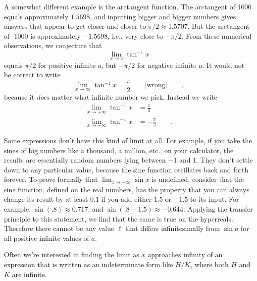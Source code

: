 A somewhat different example is the arctangent function. The arctangent of 1000 equals
approximately $1.5698$, and inputting bigger and bigger numbers gives answers that appear
to get closer and closer to $\pi/2\approx1.5707$. But the arctangent
of -1000 is approximately $-1.5698$, i.e., very close to $-\pi/2$.
From these numerical
observations, we conjecture that
\begin{equation*}
   \lim_{x\rightarrow a} \tan^{-1} x
\end{equation*}
equals $\pi/2$ for positive infinite $a$, but $-\pi/2$ for negative infinite $a$.
It would not be correct to write
\begin{equation*}
   \lim_{x\rightarrow \infty} \tan^{-1} x = \frac{\pi}{2} \qquad \text{[wrong]} \qquad ,
\end{equation*}
because it \emph{does} matter what infinite number we pick. Instead we write
\begin{align*}
   \lim_{x\rightarrow +\infty} \tan^{-1} x &= \frac{\pi}{2} \\
   \lim_{x\rightarrow -\infty} \tan^{-1} x &= -\frac{\pi}{2} \qquad .
\end{align*}

Some expressions don't have this kind of limit at all. For example, if you take the
sines of big numbers like a thousand, a million, etc., on your calculator, the results
are essentially random numbers lying between $-1$ and 1. They don't settle down to any
particular value, because the sine function oscillates back and forth forever.
To prove formally that $\lim_{x\rightarrow +\infty} \sin x$ is undefined, consider that the sine function, defined on the real
numbers, has the property that you can always change its result by at least $0.1$ if you
add either $1.5$ or $-1.5$ to its input. For example, $\sin(.8)\approx 0.717$, and $\sin(.8-1.5)\approx-0.644$.
Applying the transfer principle to this statement, we find that the same is true
on the hyperreals. Therefore there cannot be any value $\ell$ that differs infinitesimally
from $\sin a$ for all positive infinite values of $a$.

Often we're interested in finding the limit as $x$ approaches infinity of an expression
that is written as an indeterminate form like $H/K$, where both  $H$ and $K$ are infinite.

